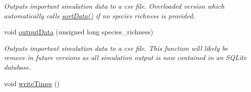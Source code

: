 \begin{DoxyCompactItemize}
\begin{DoxyCompactList}\small\item\em Outputs important simulation data to a csv file. Overloaded version which automatically calls \hyperlink{class_tree_a2d2065bbebee8b55270d2691d40cd974}{sort\+Data()} if no species richness is provided. \end{DoxyCompactList}\item 
void \hyperlink{class_tree_a5acf7d0eea9ea2ef4928bb6691b87724}{output\+Data} (unsigned long species\+\_\+richness)
\begin{DoxyCompactList}\small\item\em Outputs important simulation data to a csv file. This function will likely be remove in future versions as all simulation output is now contained in an S\+Q\+Lite database. \end{DoxyCompactList}\item 
void \hyperlink{class_tree_ab8785fc9e27868a56335048321c13290}{write\+Times} ()\hypertarget{class_tree_ab8785fc9e27868a56335048321c13290}{}\label{class_tree_ab8785fc9e27868a56335048321c13290}


\end{DoxyCompactItemize}
